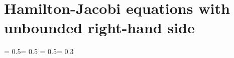 \chapter{Hamilton-Jacobi equations with unbounded right-hand side} \label{ch:hamjac}



\sloppy

\thinmuskip = 0.5\thinmuskip \medmuskip = 0.5\medmuskip
\thickmuskip = 0.5\thickmuskip \arraycolsep = 0.3\arraycolsep

\renewcommand{\theequation}{\arabic{section}.\arabic{equation}}

\def\open#1{\setbox0=\hbox{$#1$}
\baselineskip = 0pt \vbox{\hbox{\hspace*{0.4 \wd0}\tiny
$\circ$}\hbox{$#1$}} \baselineskip = 10pt\!}





